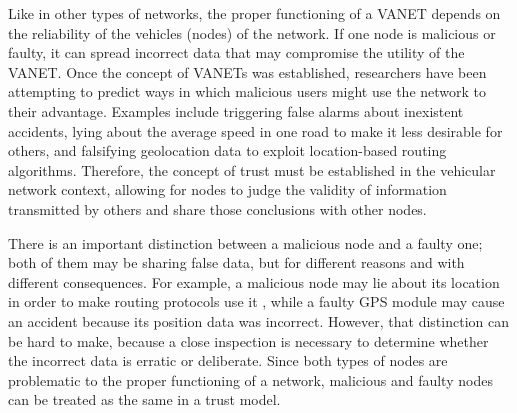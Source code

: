 \documentclass{article}
\begin{document}
Like in other types of networks, the proper functioning of a VANET depends on the reliability of the vehicles (nodes) of the network.
If one node is malicious or faulty, it can spread incorrect data that may compromise the utility of the VANET.
Once the concept of VANETs was established, researchers have been attempting to predict ways in which malicious users might use the network to their advantage.
Examples include triggering false alarms about inexistent accidents, lying about the average speed in one road to make it less desirable for others, and falsifying geolocation data to exploit location-based routing algorithms. Therefore, the concept of trust must be established in the vehicular network context, allowing for nodes to judge the validity of information transmitted by others and share those conclusions with other nodes.

There is an important distinction between a malicious node and a faulty one; both of them may be sharing false data, but for different reasons and with different consequences.
For example, a malicious node may lie about its location in order to make routing protocols use it \cite{leinmuller2005influence}, while a faulty GPS module may cause an accident because its position data was incorrect.
However, that distinction can be hard to make, because a close inspection is necessary to determine whether the incorrect data is erratic or deliberate.
Since both types of nodes are problematic to the proper functioning of a network, malicious and faulty nodes can be treated as the same in a trust model.

\end{document}
